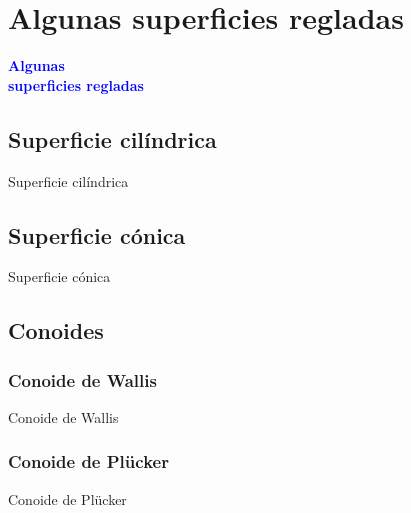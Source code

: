 \documentclass[11pt]{beamer}
\begin{document}
	\section{Algunas superficies regladas}
	
	\begin{frame}
		\begin{center}
			\Huge\textbf{\textsf{\textcolor{blue}{Algunas \\ superficies regladas}}}
		\end{center}
	\end{frame}
	
	\subsection{Superficie cilíndrica}
	
	\begin{frame}{Superficie cilíndrica}
		
	\end{frame}
	
	\subsection{Superficie cónica}
	
	\begin{frame}{Superficie cónica}
		
	\end{frame}
	
	\subsection{Conoides}
	
	\subsubsection{Conoide de Wallis}
	
	\begin{frame}{Conoide de Wallis}
		
	\end{frame}
	
	\subsubsection{Conoide de Plücker}
	
	\begin{frame}{Conoide de Plücker}
		
	\end{frame}
	
\end{document}
